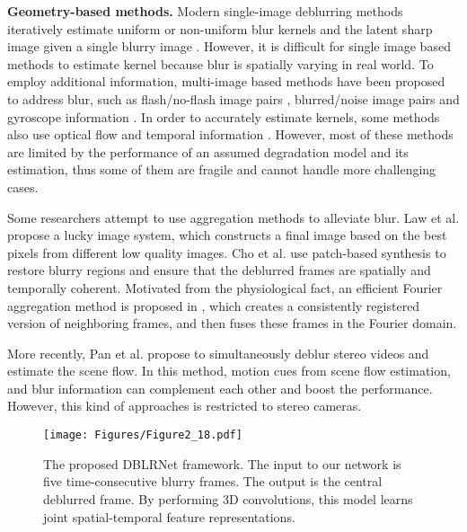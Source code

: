 \documentclass[journal]{IEEEtran}
\begin{document}
\textbf{Geometry-based methods.} Modern single-image deblurring methods iteratively estimate uniform or non-uniform blur kernels and the latent sharp image given a single blurry image \cite{gupta2010single,hirsch2011fast,hu2014joint,Jin_2017_CVPR,Srinivasan_2017_CVPR,Yan_2017_CVPR,Pan_2017_ICCV, Gong_2017_ICCV, Dong_2017_ICCV, Bahat_2017_ICCV, R._2017_ICCV, Park_2017_ICCV}. However, it is difficult for single image based methods to estimate kernel because blur is spatially varying in real world. To employ additional information, multi-image based methods \cite{ito2014blurburst,yuan2007image,petschnigg2004digital,hee2014gyro,tai2008image, Wieschollek_2017_ICCV,Ren_2017_ICCV} have been proposed to address blur, such as flash/no-flash image pairs \cite{petschnigg2004digital}, blurred/noise image pairs \cite{yuan2007image} and gyroscope information \cite{hee2014gyro}. In order to accurately estimate kernels, some methods also use optical flow \cite{hyun2015generalized} and temporal information \cite{li2010generating}.
However, most of these methods are limited by the performance of an assumed degradation model and its estimation, thus some of them are fragile and cannot handle more challenging cases.

Some researchers attempt to use aggregation methods to alleviate blur. Law et al. \cite{law2006lucky} propose a lucky image system, which constructs a final image based on the best pixels from different low quality images. Cho et al. \cite{cho2012video} use patch-based synthesis to restore blurry regions and ensure that the deblurred frames are spatially and temporally coherent. Motivated from the physiological fact, an efficient Fourier aggregation method is proposed in \cite{delbracio2015burst}, which creates a consistently registered version of neighboring frames, and then fuses these frames in the Fourier domain.

More recently, Pan et al. \cite{pan2017simultaneous} propose to simultaneously deblur stereo videos and estimate the scene flow. In this method, motion cues from scene flow estimation, and blur information can complement each other and boost the performance. However, this kind of approaches is restricted to stereo cameras.


\begin{figure*}[ht]
	\centering
	\texttt{[image: Figures/Figure2\_18.pdf]}
	\caption{The proposed DBLRNet framework. The input to our network is five time-consecutive blurry frames. The output is the central deblurred frame. By performing 3D convolutions, this model learns joint spatial-temporal feature representations.}
	\label{figure2}
\end{figure*}
\end{document}
